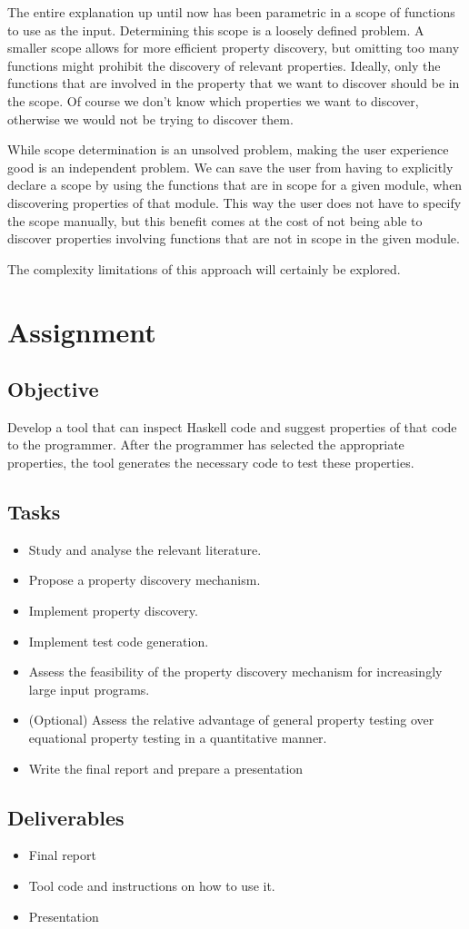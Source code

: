 \documentclass[a4paper, 11pt]{article}
\begin{document}
The entire explanation up until now has been parametric in a scope of functions to use as the input.
Determining this scope is a loosely defined problem.
A smaller scope allows for more efficient property discovery, but omitting too many functions might prohibit the discovery of relevant properties.
Ideally, only the functions that are involved in the property that we want to discover should be in the scope.
Of course we don't know which properties we want to discover, otherwise we would not be trying to discover them.

While scope determination is an unsolved problem, making the user experience good is an independent problem.
We can save the user from having to explicitly declare a scope by using the functions that are in scope for a given module, when discovering properties of that module.
This way the user does not have to specify the scope manually, but this benefit comes at the cost of not being able to discover properties involving functions that are not in scope in the given module.

The complexity limitations of this approach will certainly be explored. 


\section{Assignment}

\subsection{Objective}

Develop a tool that can inspect Haskell code and suggest properties of that code to the programmer.
After the programmer has selected the appropriate properties, the tool generates the necessary code to test these properties.


\subsection{Tasks}

\begin{itemize}
  \item Study and analyse the relevant literature.
  \item Propose a property discovery mechanism.
  \item Implement property discovery.
  \item Implement test code generation.
  \item Assess the feasibility of the property discovery mechanism for increasingly large input programs.
  \item (Optional) Assess the relative advantage of general property testing over equational property testing in a quantitative manner.
  \item Write the final report and prepare a presentation
\end{itemize}


\subsection{Deliverables}

\begin{itemize}
  \item Final report
  \item Tool code and instructions on how to use it.
  \item Presentation
\end{itemize}




\end{document}
